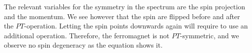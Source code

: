 \documentclass[../main.tex]{main.tex}
\begin{document}
\begin{figure}[H]

\end{figure}
The relevant variables for the symmetry in the spectrum are the spin projection and the momentum. We see however that the spin are flipped before and after the $PT$-operation.
Letting the spin points downwards again will require to use an additional operation. Therefore, the ferromagnet is not $PT$-symmetric, and we observe no spin degeneracy as the
equation shows it.\\
\end{document}
